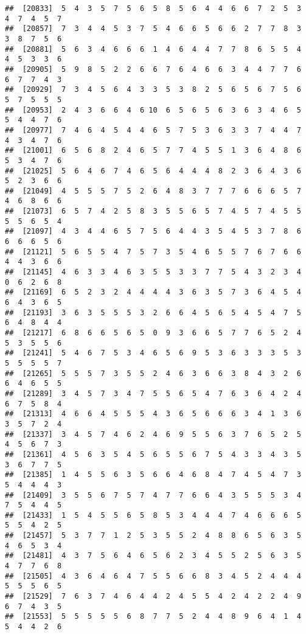 \documentclass[
]{book}
\begin{document}
\begin{verbatim}
##  [20833]  5  4  3  5  7  5  6  5  8  5  6  4  4  6  6  7  2  5  3  4  7  4  5  7
##  [20857]  7  3  4  4  5  3  7  5  4  6  6  5  6  6  2  7  7  8  3  3  8  7  5  6
##  [20881]  5  6  3  4  6  6  6  1  4  6  4  4  7  7  8  6  5  5  4  4  5  3  3  6
##  [20905]  5  9  8  5  2  2  6  6  7  6  4  6  6  3  4  4  7  7  6  6  7  7  4  3
##  [20929]  7  3  4  5  6  4  3  3  5  3  8  2  5  6  5  6  7  5  6  5  7  5  5  5
##  [20953]  2  4  3  6  6  4  6 10  6  5  6  5  6  3  6  3  4  6  5  5  4  4  7  6
##  [20977]  7  4  6  4  5  4  4  6  5  7  5  3  6  3  3  7  4  4  7  4  3  4  7  6
##  [21001]  6  5  6  8  2  4  6  5  7  7  4  5  5  1  3  6  4  8  6  5  3  4  7  6
##  [21025]  5  6  4  6  7  4  6  5  6  4  4  4  8  2  3  6  4  3  6  5  2  3  6  6
##  [21049]  4  5  5  5  7  5  2  6  4  8  3  7  7  7  6  6  6  5  7  4  6  8  6  6
##  [21073]  6  5  7  4  2  5  8  3  5  5  6  5  7  4  5  7  4  5  5  5  5  6  5  4
##  [21097]  4  3  4  4  6  5  7  5  6  4  4  3  5  4  5  3  7  8  6  6  6  6  5  6
##  [21121]  5  6  5  5  4  7  5  7  3  5  4  6  5  5  7  6  7  6  6  4  4  3  6  6
##  [21145]  4  6  3  3  4  6  3  5  5  3  3  7  7  5  4  3  2  3  4  0  6  2  6  8
##  [21169]  6  5  2  3  2  4  4  4  4  3  6  3  5  7  3  6  4  5  4  6  4  3  6  5
##  [21193]  3  6  3  5  5  5  3  2  6  6  4  5  6  5  4  5  4  7  5  6  4  8  4  4
##  [21217]  6  8  6  6  5  6  5  0  9  3  6  6  5  7  7  6  5  2  4  5  3  5  5  6
##  [21241]  5  4  6  7  5  3  4  6  5  6  9  5  3  6  3  3  3  5  3  5  5  5  5  7
##  [21265]  5  5  5  7  3  5  5  2  4  6  3  6  6  3  8  4  3  2  6  6  4  6  5  5
##  [21289]  3  4  5  7  3  4  7  5  5  6  5  4  7  6  3  6  4  2  4  6  7  5  8  4
##  [21313]  4  6  6  4  5  5  5  4  3  6  5  6  6  6  3  4  1  3  6  3  5  7  2  4
##  [21337]  3  4  5  7  4  6  2  4  6  9  5  5  6  3  7  6  5  2  5  4  5  6  7  3
##  [21361]  4  5  6  3  5  4  5  6  5  5  6  7  5  4  3  3  4  3  5  3  6  7  7  5
##  [21385]  1  4  5  5  6  3  5  6  6  4  6  8  4  7  4  5  4  7  3  5  4  4  4  3
##  [21409]  3  5  5  6  7  5  7  4  7  7  6  6  4  3  5  5  5  3  4  7  5  4  4  5
##  [21433]  1  5  4  5  5  6  5  8  5  3  4  4  4  7  4  6  6  6  5  5  5  4  2  5
##  [21457]  5  3  7  7  1  2  5  3  5  5  2  4  8  8  6  5  6  3  5  4  6  5  3  4
##  [21481]  4  3  7  5  6  4  6  5  6  2  3  4  5  5  2  5  6  3  5  4  7  7  6  8
##  [21505]  4  3  6  4  6  4  7  5  5  6  6  8  3  4  5  2  4  4  4  5  5  5  6  5
##  [21529]  7  6  3  7  4  6  4  4  2  4  5  5  4  2  4  2  2  4  9  6  7  4  3  5
##  [21553]  5  5  5  5  5  6  8  7  7  5  2  4  4  8  9  6  4  1  4  5  4  4  2  6

\end{verbatim}
\end{document}
